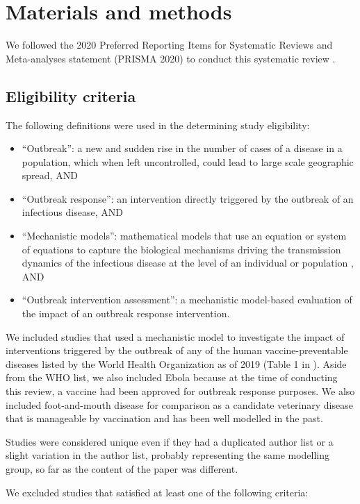 \documentclass[10pt,letterpaper]{article}
\begin{document}
\section*{Materials and methods}
We followed the 2020 Preferred Reporting Items for Systematic Reviews and Meta-analyses statement (PRISMA 2020)  to conduct this systematic review \cite{Page2021}.

\subsection*{Eligibility criteria}
The following definitions were used in the determining study eligibility:

\begin{itemize}
	\item ``Outbreak'': a new and sudden rise in the number of cases of a disease in a population, which when left uncontrolled, could lead to large scale geographic spread, AND 
	\item ``Outbreak response'': an intervention directly triggered by the outbreak of an infectious disease, AND
	\item ``Mechanistic models'': mathematical models that use an equation or system of equations to capture the biological mechanisms driving the transmission dynamics of the infectious disease at the level of an individual or population \cite{Lessler2016a,Reiner2013}, AND
	\item ``Outbreak intervention assessment'': a mechanistic model-based evaluation of the impact of an outbreak response intervention.
\end{itemize}

We included studies that used a mechanistic model to investigate the impact of interventions triggered by the outbreak of any of the human vaccine-preventable diseases listed by the World Health Organization as of 2019 (Table 1 in ). Aside from the WHO list, we also included Ebola because at the time of conducting this review, a vaccine had been approved for outbreak response purposes. We also included foot-and-mouth disease for comparison as a candidate veterinary disease that is manageable by vaccination and has been well modelled in the past. 


Studies were considered unique even if they had a duplicated author list or a slight variation in the author list, probably representing the same modelling group, so far as the content of the paper was different. 


We excluded studies that satisfied at least one of the following criteria: 
\end{document}
